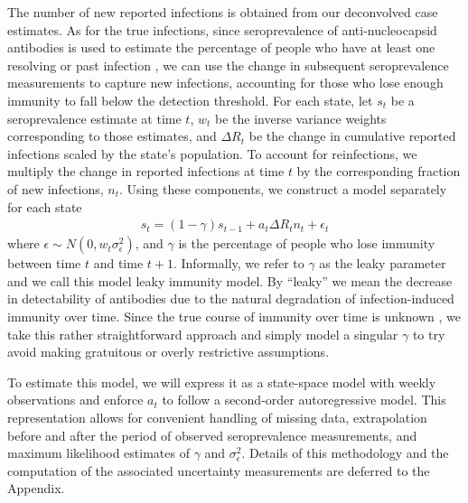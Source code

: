 \documentclass{article}
\begin{document}
The number of new reported infections is obtained from our
deconvolved case estimates. As for the true
infections, since seroprevalence of anti-nucleocapsid antibodies is used to
estimate the percentage of people who have at least one resolving or past
infection \citep{cdc2020data}, we can use
the change in subsequent seroprevalence measurements to capture new infections, 
accounting for those who lose enough immunity to fall below the detection threshold.
For each state, let $s_t$ be a seroprevalence estimate at time $t$, $w_t$ be the
inverse variance weights corresponding to those estimates, and $\Delta R_t$ be
the change in cumulative reported infections scaled by the state's population.
To account for reinfections, we multiply the change in reported infections at
time $t$ by the corresponding fraction of new infections, $n_t$. Using these
components, we construct a model separately for each state
\begin{align}
s_t = (1 -\gamma)s_{t-1} + a_t\Delta R_t n_t + \epsilon_t \label{eq:leakypr}
\end{align}
where $\epsilon \sim N(0, w_t\sigma^2_\epsilon)$, and $\gamma$ is the percentage
of people who lose immunity between time $t$ and time $t+1$.
Informally, we refer to $\gamma$ as the leaky parameter and we call this model leaky 
immunity model. By ``leaky'' we mean the decrease in detectability of antibodies 
due to the natural degradation of infection-induced
immunity over time. Since the true course of immunity over time is unknown
\citep{goldberg2022protection}, we take this rather straightforward approach 
and simply model a singular $\gamma$ to try
avoid making gratuitous or overly restrictive assumptions. 

To estimate this
model, we will express it as a state-space model with weekly observations and
enforce $a_t$ to follow a second-order autoregressive model. This representation
allows for convenient handling of missing data, extrapolation before and after
the period of observed seroprevalence measurements, and maximum likelihood
estimates of $\gamma$ and $\sigma^2_\epsilon$. Details of this methodology and
the computation of the associated uncertainty measurements are deferred to the
Appendix. 
\end{document}
